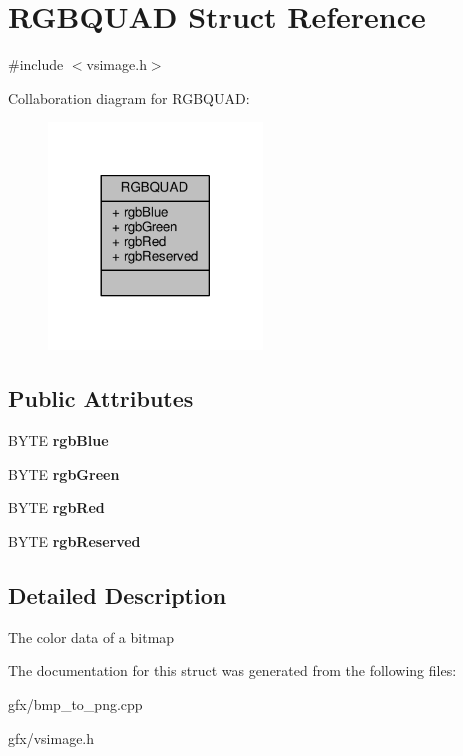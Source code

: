 \hypertarget{structRGBQUAD}{}\section{R\+G\+B\+Q\+U\+AD Struct Reference}
\label{structRGBQUAD}


{\ttfamily \#include $<$vsimage.\+h$>$}



Collaboration diagram for R\+G\+B\+Q\+U\+AD\+:
\nopagebreak
\begin{figure}[H]
\begin{center}
\leavevmode
\includegraphics[width=161pt]{d1/df1/structRGBQUAD__coll__graph}
\end{center}
\end{figure}
\subsection*{Public Attributes}
\begin{DoxyCompactItemize}
\item 
B\+Y\+TE {\bfseries rgb\+Blue}\hypertarget{structRGBQUAD_a8de8ebfeae241eba90ca488d65f1e9d1}{}\label{structRGBQUAD_a8de8ebfeae241eba90ca488d65f1e9d1}

\item 
B\+Y\+TE {\bfseries rgb\+Green}\hypertarget{structRGBQUAD_a865a89fcf92d07b8bf6c9ebdbbcf0525}{}\label{structRGBQUAD_a865a89fcf92d07b8bf6c9ebdbbcf0525}

\item 
B\+Y\+TE {\bfseries rgb\+Red}\hypertarget{structRGBQUAD_aa5b587a190ecbcbc738fd300537084fd}{}\label{structRGBQUAD_aa5b587a190ecbcbc738fd300537084fd}

\item 
B\+Y\+TE {\bfseries rgb\+Reserved}\hypertarget{structRGBQUAD_a56e850c6d5112ce9e59406097b8b969e}{}\label{structRGBQUAD_a56e850c6d5112ce9e59406097b8b969e}

\end{DoxyCompactItemize}


\subsection{Detailed Description}
The color data of a bitmap 

The documentation for this struct was generated from the following files\+:\begin{DoxyCompactItemize}
\item 
gfx/bmp\+\_\+to\+\_\+png.\+cpp\item 
gfx/vsimage.\+h\end{DoxyCompactItemize}
